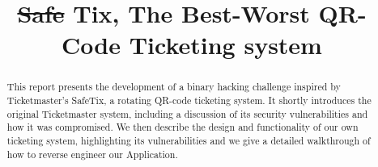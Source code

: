 \documentclass[conference,dvipsnames]{IEEEtran}
\newcommand{\soutthick}[1]{%
    \renewcommand{\ULthickness}{3pt}%
       \sout{#1}%
    \renewcommand{\ULthickness}{.3pt}%
}
\begin{document}
\title{\soutthick{Safe}Tix, The Best-Worst QR-Code Ticketing system}

\author{
}

\maketitle

\begin{abstract}
  This report presents the development of a binary hacking challenge inspired by Ticketmaster's SafeTix, a rotating QR-code ticketing system. 
  It shortly introduces the original Ticketmaster system, including a discussion of its security vulnerabilities and how it was compromised. 
  We then describe the design and functionality of our own ticketing system, highlighting its vulnerabilities and we give a detailed walkthrough of how to reverse engineer our Application.
\end{abstract}









\clearpage
%
\end{document}
